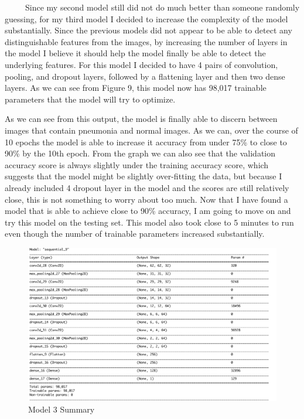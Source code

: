 \documentclass[12pt]{article}
\begin{document}
~~~~~Since my second model still did not do much better than someone
randomly guessing, for my third model I decided to increase the
complexity of the model substantially. Since the previous models did not
appear to be able to detect any distinguishable features from the
images, by increasing the number of layers in the model I believe it
should help the model finally be able to detect the underlying features.
For this model I decided to have 4 pairs of convolution, pooling, and
dropout layers, followed by a flattening layer and then two dense
layers. As we can see from Figure 9, this model now has 98,017 trainable
parameters that the model will try to optimize.

As we can see from this output, the model is finally able to discern
between images that contain pneumonia and normal images. As we can, over
the course of 10 epochs the model is able to increase it accuracy from
under 75\% to close to 90\% by the 10th epoch. From the graph we can
also see that the validation accuracy score is always slightly under the
training accuracy score, which suggests that the model might be slightly
over-fitting the data, but because I already included 4 dropout layer in
the model and the scores are still relatively close, this is not
something to worry about too much. Now that I have found a model that is
able to achieve close to 90\% accuracy, I am going to move on and try
this model on the testing set. This model also took close to 5 minutes
to run even though the number of trainable parameters increased
substantially.

\begin{figure}

{\centering \includegraphics[width=0.75\linewidth,height=0.25\textheight]{images/model3} 

}

\caption{Model 3 Summary}\label{fig:sample-fig10}
\end{figure}
\end{document}
